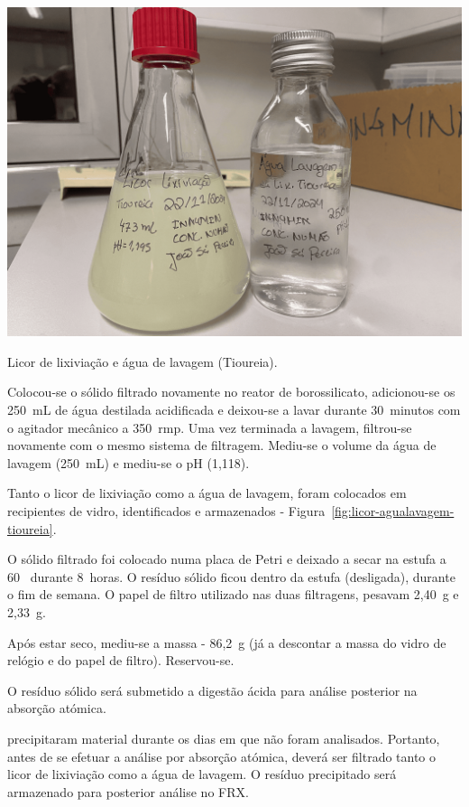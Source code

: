 \begin{marginfigure}
    \centering
    \includegraphics[width=0.9\linewidth]{figures/Lixiviação Tioureia (Licor e Água de Lavagem)}
    \caption{Licor de lixiviação e água de lavagem (Tioureia).}
    \label{fig:licor-agualavagem-tioureia}
\end{marginfigure}

Colocou-se o sólido filtrado novamente no reator de borossilicato, adicionou-se os 250~mL de água destilada acidificada e deixou-se a lavar durante 30~minutos com o agitador mecânico a 350~rmp.
Uma vez terminada a lavagem, filtrou-se novamente com o mesmo sistema de filtragem.
Mediu-se o volume da água de lavagem (250~mL) e mediu-se o pH (1,118).

Tanto o licor de lixiviação como a água de lavagem, foram colocados em recipientes de vidro, identificados e armazenados - Figura~\ref{fig:licor-agualavagem-tioureia}.

O sólido filtrado foi colocado numa placa de Petri e deixado a secar na estufa a 60~\graus{} durante 8~horas.
O resíduo sólido ficou dentro da estufa (desligada), durante o fim de semana.
O papel de filtro utilizado nas duas filtragens, pesavam 2,40~g e 2,33~g.

Após estar seco, mediu-se a massa - 86,2~g (já a descontar a massa do vidro de relógio e do papel de filtro). 
Reservou-se.

O resíduo sólido será submetido a digestão ácida para análise posterior na absorção atómica.

 precipitaram material durante os dias em que não foram analisados.
Portanto, antes de se efetuar a análise por absorção atómica, deverá ser filtrado tanto o licor de lixiviação como a água de lavagem. 
O resíduo precipitado será armazenado para posterior análise no FRX.

